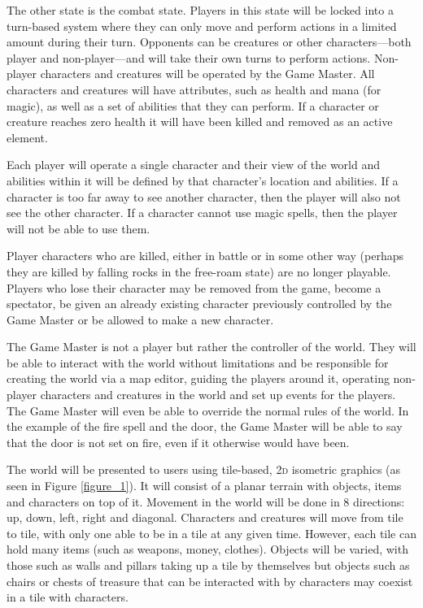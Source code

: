 \documentclass[11pt,fleqn,twoside]{article}
\begin{document}
The other state is the combat state. Players in this state will be locked into a turn-based system where they can only move and perform actions in a limited amount during their turn. Opponents can be creatures or other characters—both player and non-player—and will take their own turns to perform actions. Non-player characters and creatures will be operated by the Game Master. All characters and creatures will have attributes, such as health and mana (for magic), as well as a set of abilities that they can perform. If a character or creature reaches zero health it will have been killed and removed as an active element.

Each player will operate a single character and their view of the world and abilities within it will be defined by that character's location and abilities. If a character is too far away to see another character, then the player will also not see the other character. If a character cannot use magic spells, then the player will not be able to use them.

Player characters who are killed, either in battle or in some other way (perhaps they are killed by falling rocks in the free-roam state) are no longer playable. Players who lose their character may be removed from the game, become a spectator, be given an already existing character previously controlled by the Game Master or be allowed to make a new character.

The Game Master is not a player but rather the controller of the world. They will be able to interact with the world without limitations and be responsible for creating the world via a map editor, guiding the players around it, operating non-player characters and creatures in the world and set up events for the players. The Game Master will even be able to override the normal rules of the world. In the example of the fire spell and the door, the Game Master will be able to say that the door is not set on fire, even if it otherwise would have been.

The world will be presented to users using tile-based, \textsc{2d} isometric graphics (as seen in Figure \ref{figure_1}). It will consist of a planar terrain with objects, items and characters on top of it. Movement in the world will be done in 8 directions: up, down, left, right and diagonal. Characters and creatures will move from tile to tile, with only one able to be in a tile at any given time. However, each tile can hold many items (such as weapons, money, clothes). Objects will be varied, with those such as walls and pillars taking up a tile by themselves but objects such as chairs or chests of treasure that can be interacted with by characters may coexist in a tile with characters.
\end{document}
